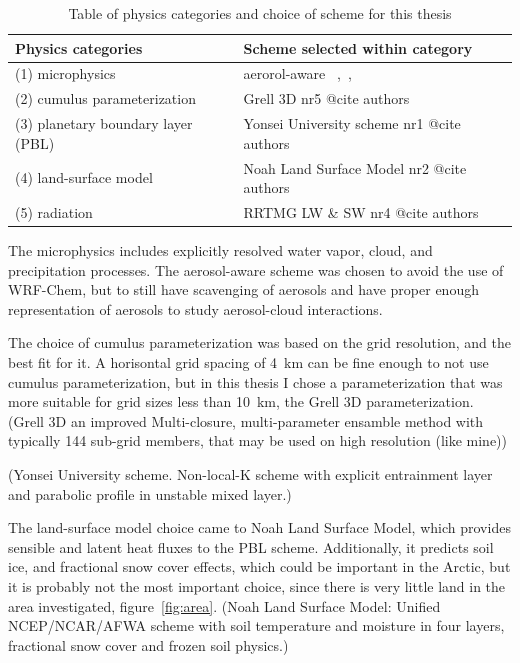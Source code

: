 \begin{table}[H]
\centering
\caption{Table of physics categories and choice of scheme for this thesis}
\label{tab:physics} 
\begin{tabular}{L{6.cm} L{6.cm}}
\centering
\textbf{Physics categories} & \textbf{Scheme selected within category}\\ \hline
(1) microphysics & aerorol-aware ~\citep{Reisner1998},~\citep{Thompson2004},~\citep{Thompson2008}~\citep{Thompson2014} \\
(2) cumulus parameterization & Grell 3D  nr5 @cite authors \\
(3) planetary boundary layer (PBL) &  Yonsei University scheme nr1 @cite authors\\
(4) land-surface model & Noah Land Surface Model nr2 @cite authors\\
(5) radiation & RRTMG LW \& SW nr4 @cite authors\\
\end{tabular}
\end{table}

The microphysics includes explicitly resolved water vapor, cloud, and precipitation processes. The aerosol-aware scheme was chosen to avoid the use of WRF-Chem, but to still have scavenging of aerosols and have proper enough representation of aerosols to study aerosol-cloud interactions.

The choice of cumulus parameterization was based on the grid resolution, and the best fit for it. A horisontal grid spacing of 4~km can be fine enough to not use cumulus parameterization, but in this thesis I chose a parameterization that was more suitable for grid sizes less than 10~km, the Grell 3D parameterization. (Grell 3D an improved Multi-closure, multi-parameter ensamble method with typically 144 sub-grid members, that may be used on high resolution (like mine)) 

(Yonsei University scheme. Non-local-K scheme with explicit entrainment layer and parabolic profile in unstable mixed layer.)

The land-surface model choice came to Noah Land Surface Model, which provides sensible and latent heat fluxes to the PBL scheme. Additionally, it predicts soil ice, and fractional snow cover effects, which could be important in the Arctic, but it is probably not the most important choice, since there is very little land in the area investigated, figure~\ref{fig:area}. (Noah Land Surface Model: Unified NCEP/NCAR/AFWA scheme with soil temperature and moisture in four layers, fractional snow cover and frozen soil physics.)

